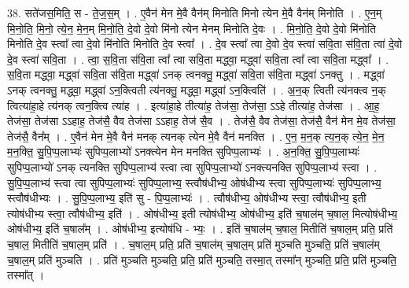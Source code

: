 \documentclass[17pt]{extarticle}
\begin{document}
38. सते॑जस॒मिति॒ स - ते॒ज॒स॒म् । . ए॒वैन॑ मेन मे॒वै वैन॑म् मिनोति मिनो त्येन मे॒वै वैन॑म् मिनोति । . ए॒न॒म् मि॒नो॒ति॒ मि॒नो॒ त्ये॒न॒ मे॒न॒म् मि॒नो॒ति॒ दे॒वो दे॒वो मि॑नो त्येन मेनम् मिनोति दे॒वः । . मि॒नो॒ति॒ दे॒वो दे॒वो मि॑नोति मिनोति दे॒व स्त्वा᳚ त्वा दे॒वो मि॑नोति मिनोति दे॒व स्त्वा᳚ । . दे॒व स्त्वा᳚ त्वा दे॒वो दे॒व स्त्वा॑ सवि॒ता स॑वि॒ता त्वा॑ दे॒वो दे॒व स्त्वा॑ सवि॒ता । . त्वा॒ स॒वि॒ता स॑वि॒ता त्वा᳚ त्वा सवि॒ता मद्ध्वा॒ मद्ध्वा॑ सवि॒ता त्वा᳚ त्वा सवि॒ता मद्ध्वा᳚ । . स॒वि॒ता मद्ध्वा॒ मद्ध्वा॑ सवि॒ता स॑वि॒ता मद्ध्वा॑ ऽनक् त्वनक्तु॒ मद्ध्वा॑ सवि॒ता स॑वि॒ता मद्ध्वा॑ ऽनक्तु । . मद्ध्वा॑ ऽनक् त्वनक्तु॒ मद्ध्वा॒ मद्ध्वा॑ ऽन॒क्त्विती त्य॑नक्तु॒ मद्ध्वा॒ मद्ध्वा॑ ऽन॒क्त्विति॑ । . अ॒न॒क् त्विती त्य॑नक्त्व न॒क् त्वित्या॑हा॒हे त्य॑नक् त्वन॒क्त्वि त्या॑ह । . इत्या॑हा॒हे तीत्या॑ह॒ तेज॑सा॒ तेज॑सा॒ ऽऽहे तीत्या॑ह॒ तेज॑सा । . आ॒ह॒ तेज॑सा॒ तेज॑सा ऽऽहाह॒ तेज॑सै॒ वैव तेज॑सा ऽऽहाह॒ तेज॑ सै॒व । . तेज॑सै॒ वैव तेज॑सा॒ तेज॑सै॒ वैन॑ मेन मे॒व तेज॑सा॒ तेज॑सै॒ वैन᳚म् । . ए॒वैन॑ मेन मे॒वै वैन॑ मनक् त्यनक् त्येन मे॒वै वैन॑ मनक्ति । . ए॒न॒ म॒न॒क् त्य॒न॒क् त्ये॒न॒ मे॒न॒ म॒न॒क्ति॒ सु॒पि॒प्प॒लाभ्यः॑ सुपिप्प॒लाभ्यो॑ ऽनक्त्येन मेन मनक्ति सुपिप्प॒लाभ्यः॑ । . अ॒न॒क्ति॒ सु॒पि॒प्प॒लाभ्यः॑ सुपिप्प॒लाभ्यो॑ ऽनक् त्यनक्ति सुपिप्प॒लाभ्य॑ स्त्वा त्वा सुपिप्प॒लाभ्यो॑ ऽनक्त्यनक्ति सुपिप्प॒लाभ्य॑ स्त्वा । . सु॒पि॒प्प॒लाभ्य॑ स्त्वा त्वा सुपिप्प॒लाभ्यः॑ सुपिप्प॒लाभ्य॒ स्त्वौष॑धीभ्य॒ ओष॑धीभ्य स्त्वा सुपिप्प॒लाभ्यः॑ सुपिप्प॒लाभ्य॒ स्त्वौष॑धीभ्यः । . सु॒पि॒प्प॒लाभ्य॒ इति॑ सु - पि॒प्प॒लाभ्यः॑ । . त्वौष॑धीभ्य॒ ओष॑धीभ्य स्त्वा॒ त्वौष॑धीभ्य॒ इती त्योष॑धीभ्य स्त्वा॒ त्वौष॑धीभ्य॒ इति॑ । . ओष॑धीभ्य॒ इती त्योष॑धीभ्य॒ ओष॑धीभ्य॒ इति॑ च॒षाल॑म् च॒षाल॒ मित्योष॑धीभ्य॒ ओष॑धीभ्य॒ इति॑ च॒षाल᳚म् । . ओष॑धीभ्य॒ इत्योष॑धि - भ्यः॒ । . इति॑ च॒षाल॑म् च॒षाल॒ मितीति॑ च॒षाल॒म् प्रति॒ प्रति॑ च॒षाल॒ मितीति॑ च॒षाल॒म् प्रति॑ । . च॒षाल॒म् प्रति॒ प्रति॑ च॒षाल॑म् च॒षाल॒म् प्रति॑ मुञ्चति मुञ्चति॒ प्रति॑ च॒षाल॑म् च॒षाल॒म् प्रति॑ मुञ्चति । . प्रति॑ मुञ्चति मुञ्चति॒ प्रति॒ प्रति॑ मुञ्चति॒ तस्मा॒त् तस्मा᳚न् मुञ्चति॒ प्रति॒ प्रति॑ मुञ्चति॒ तस्मा᳚त् । \newline
\pagebreak
{}
\end{document}
